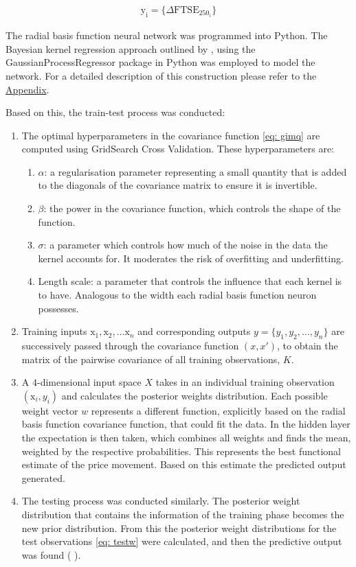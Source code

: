 \documentclass[11pt,a4paper]{article}
\newcommand{\citeboth}[1]{\citeauthor{#1} \citep{#1}}
\begin{document}
\begin{align}
    \boldsymbol{\mathrm{y_i}} = \{\Delta \text{FTSE}_{250_i}\}
\end{align}

The radial basis function neural network was programmed into Python. The Bayesian kernel regression approach outlined by 
\citeboth{bishop1995}, using the GaussianProcessRegressor package in Python was employed to model the network. For a 
detailed description of this construction please refer to the \hyperref[sec: appendix]{Appendix}.


Based on this, the train-test process was conducted:
\begin{enumerate}
    \item The optimal hyperparameters in the covariance function \eqref{eq: gimq} 
    are computed using GridSearch Cross Validation. These hyperparameters are:
    \begin{enumerate}
        \item $\alpha$: a regularisation parameter representing a small quantity
        that is added to the diagonals of the covariance matrix to ensure it is 
        invertible. 
        \item $\beta$: the power in the covariance function, which controls the shape of the function.
        \item $\sigma$: a parameter which controls how much of the noise in the data the kernel accounts for. It moderates the risk of overfitting and underfitting.
        \item Length scale: a parameter that controls the influence that each kernel is to have. Analogous to 
        the width each radial basis function neuron possesses.
    \end{enumerate}
    \item Training inputs $\boldsymbol{\mathrm{x}}_1, \boldsymbol{\mathrm{x}}_2,\ldots \boldsymbol{\mathrm{x}}_{n}$
    and corresponding outputs \( y = \{y_1, y_2, \dots, y_n\} \) are successively passed through the 
    covariance function $(x,x')$, to obtain the matrix of the pairwise covariance of 
    all training observations, $K$.
    \item A $4$-dimensional input space $X$ takes in an individual training observation $(\boldsymbol{\mathrm{x}}_{i}, y_i)$ and 
    calculates the posterior weights distribution. 
    Each possible weight vector $w$ represents a different function, explicitly 
    based on the radial basis function covariance function, that could fit the data. In the 
    hidden layer the expectation is then taken, which
    combines all weights and finds the mean, weighted by the 
    respective probabilities. This represents the best functional estimate of the price movement. Based on this estimate 
    the predicted output generated.
    \item The testing process was conducted similarly. The 
    posterior weight distribution that contains the information of the training phase becomes the new 
    prior distribution. From this the posterior weight distributions for the test observations \eqref{eq: testw}
    were calculated, and then the predictive output was found (\citeboth{rasmussen2006}).
    

\end{enumerate}
\end{document}
